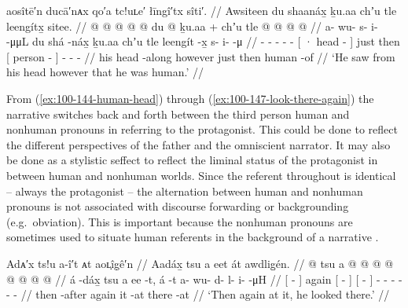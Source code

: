 \ex\label{ex:100-144-human-head}%
%
\begingl
	\glpreamble	aosîtē′n ducā′nᴀx qo′a tc!uʟe′ łīngî′tx sîti′. //
	\glpreamble	Awsiteen du shaanáx̱ ḵu.aa chʼu tle leengítx̱ sitee. //
	\gla	{} @ {} @ {} @ {} @ {} @ {}
		{} du  @ {} {} ḵu.aa +
		chʼu tle {}  @ {} {} 
		 @ {} @ {} @ {} //
	\glb	a- wu- s- i-  -μμL
		{} du shá -náx̱ {} ḵu.aa 
		chʼu tle {} leengít -x̱ {} 
		s- i-  -μ //
	\glc	{}- - - -  -
		{}[ · head - {}] 
		just then {}[ person - {}]
		- -  - //
	\gld	{} {} {} {} {} {}
		{} his head -along {} however
		just then {} human -of {}
		 {} {} {} //
	\glft	‘He saw from his head however that he was human.’
		//
\endgl
\xe

From (\ref{ex:100-144-human-head}) through (\ref{ex:100-147-look-there-again}) the narrative switches back and forth between the third person human and nonhuman pronouns in referring to the protagonist.
This could be done to reflect the different perspectives of the father and the omniscient narrator.
It may also be done as a stylistic seffect to reflect the liminal status of the protagonist in between human and nonhuman worlds.
Since the referent throughout is identical – always the protagonist – the alternation between human and nonhuman pronouns is not associated with discourse forwarding or backgrounding (e.g.\ obviation).
This is important because the nonhuman pronouns are sometimes used to situate human referents in the background of a narrative \parencites{leer:1990b}{leer:1993}.

\ex\label{ex:100-145-look-there-again}%
%
\begingl
	\glpreamble	Adᴀ′x ts!u a-î′t ᴀt aoʟ̣îg̣ê′n //
	\glpreamble	Aadáx̱ tsu a eet át awdlig̱én. //
	\gla	{}  @ {} {} tsu 
		{} a  @ {} {} 
		{}  @ {} {} 
		 @ {} @ {} @ {} @ {} @ {} @ {} //
	\glb	{} á -dáx̱ {} tsu
		{} a ee -t, {} 
		{} á -t {}
		a- wu- d- l- i-  -μH //
	\glc	{}[  - {}] again 
		{}[   - {}]
		{}[  - {}]
		- - - - -  - //
	\gld	{} then -after {} again 
		{} it {} -at {}
		{} there -at {}
		 {} {} {} {} {} {} //
	\glft	‘Then again at it, he looked there.’
		//
\endgl
\xe

